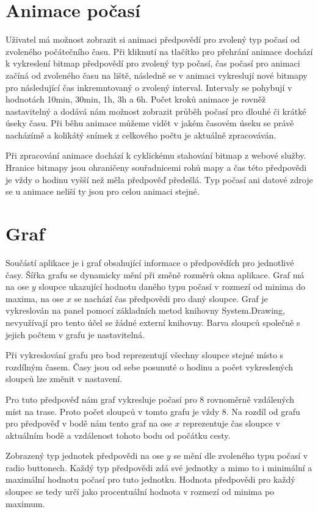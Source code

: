 \documentclass[czech,bachelor,dept460,male,csharp,cpdeclaration]{diploma}
\begin{document}
	\section{Animace počasí}
	
	Uživatel má možnost zobrazit si animaci předpovědí pro zvolený typ počasí od zvoleného počátečního času. Při kliknutí na tlačítko pro přehrání animace dochází k vykreslení bitmap předpovědí pro zvolený typ počasí, čas počasí pro animaci začíná od zvoleného času na liště, následně se v animaci vykreslují nové bitmapy pro následující čas inkremntovaný o zvolený interval. Intervaly se pohybují v hodnotách 10min, 30min, 1h, 3h a 6h. Počet kroků animace je rovněž nastavitelný a dodává nám možnost zobrazit průběh počasí pro dlouhé či krátké úseky času. Při běhu animace můžeme vidět v jakém časovém úseku se právě nacházímě a kolikátý snímek z celkového počtu je aktuálně zpracováván.
	
	Při zpracování animace dochází k cyklickému stahování bitmap z webové služby. Hranice bitmapy jsou ohraničeny souřadnicemi rohů mapy a čas této předpovědi je vždy o hodinu vyšší než měla předpověď předešlá. Typ počasí ani datové zdroje se u animace neliší ty jsou pro celou animaci stejné.
	
	\section{Graf}
	
	Součástí aplikace je i graf obsahující informace o předpovědích pro jednotlivé časy. Šířka grafu se dynamicky mění při změně rozměrů okna aplikace. Graf má na ose $y$ sloupce ukazující hodnotu daného typu počasí v rozmezí od minima do maxima, na ose $x$ se nachází čas předpovědi pro daný sloupce. Graf je vykreslován na panel pomocí základních metod knihovny System.Drawing, nevyužívají pro tento účel se žádné externí knihovny. Barva sloupců společně s jejich počtem v grafu je nastavitelná.
	
	Při vykreslování grafu pro bod reprezentují všechny sloupce stejné místo s rozdílným časem. Časy jsou od sebe posunuté o hodinu a počet vykreslených sloupců lze změnit v nastavení.
	
	Pro tuto předpověď nám graf vykresluje počasí pro 8 rovnoměrně vzdálených míst na trase. Proto počet sloupců v tomto grafu je vždy 8. Na rozdíl od grafu pro předpověď v bodě nám tento graf na ose $x$ reprezentuje čas sloupce v aktuálním bodě a vzdálenost tohoto bodu od počátku cesty.
	
	Zobrazený typ jednotek předpovědi na ose $y$ se mění dle zvoleného typu počasí v radio buttonech. Každý typ předpovědi zdá své jednotky a mimo to i minimální a maximální hodnotu počasí pro tuto jednotku. Hodnota předpovědi pro každý sloupec se tedy určí jako procentuální hodnota v rozmezí od minima po maximum.
	
\end{document}
